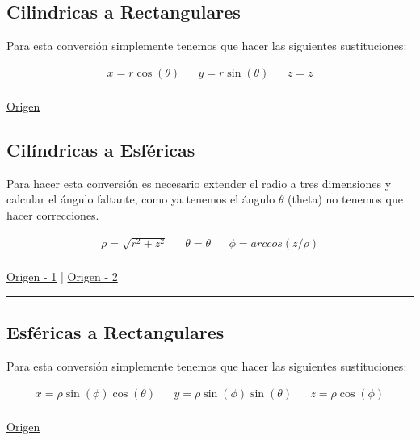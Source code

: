 \documentclass{article}
\begin{document}
\subsection{Cilindricas a Rectangulares}
\label{sec:orgf43e1ad}
Para esta conversión simplemente tenemos que hacer las siguientes sustituciones:

\[\begin{aligned}
 x = r \cos(\theta) && y = r \sin(\theta) && z = z \\
\end{aligned}\] 

\href{https://www.neurochispas.com/wiki/coordenadas-cilindricas-a-cartesianas/}{Origen}

\subsection{Cilíndricas a Esféricas}
\label{sec:org11fa27b}
Para hacer esta conversión es necesario extender el radio a tres dimensiones y calcular el ángulo faltante, como ya tenemos el ángulo \(\theta\) (theta) no tenemos que hacer correcciones.

\[\begin{aligned}
 \rho = \sqrt{r^2+z^2} && 
 \theta = \theta  &&
 \phi = arccos\left( z/\rho \right) \\
\end{aligned}\] 

\href{http://www.learningaboutelectronics.com/Articulos/Calculadora-de-conversion-de-coordenadas-cilindricas-a-esfericas.php}{Origen - 1} | \href{https://math.libretexts.org/Bookshelves/Calculus/Book:\_Calculus\_(OpenStax)/12:\_Vectors\_in\_Space/12.7:\_Cylindrical\_and\_Spherical\_Coordinates\#:\~:text=To\%20convert\%20a\%20point\%20from,r2+z2).}{Origen - 2}

\noindent\rule{\textwidth}{0.5pt}

\subsection{Esféricas a Rectangulares}
\label{sec:org4296710}
Para esta conversión simplemente tenemos que hacer las siguientes sustituciones:

\[\begin{aligned}
 x = \rho \sin(\phi)\cos(\theta) && 
 y = \rho \sin(\phi)\sin(\theta) &&
 z = \rho \cos(\phi) \\
\end{aligned}\] 

\href{https://www.neurochispas.com/wiki/coordenadas-esfericas-a-cartesianas/}{Origen}
\end{document}
